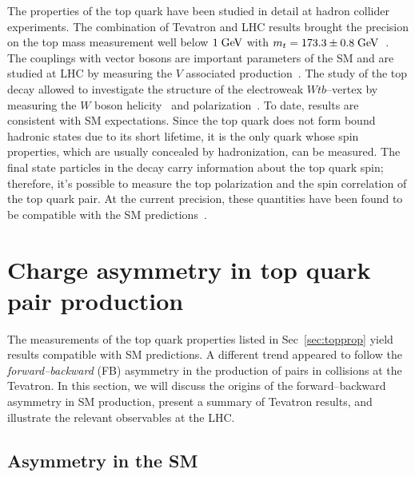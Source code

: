 The properties of the top quark have been studied in detail at hadron
collider experiments. The combination of Tevatron and LHC results
brought the precision on the top mass measurement well below $1 \; \mathrm{GeV}{}$
with $m_t=173.3\pm{}0.8 \; \mathrm{GeV}{}$~\cite{topmass}.
The couplings with vector bosons are important parameters of the SM
and are studied at LHC by measuring the \ttbar{}$V$ associated
production~\cite{CMS-PAS-TOP-13-011,ATLAS-CONF-2014-038}.
The study of the top decay allowed to investigate the structure of the
electroweak $Wtb$--vertex by measuring the $W$ boson
helicity~\cite{Khachatryan:2014vma} and
polarization~\cite{ATLAS-CONF-2013-033}. To date, results are
consistent with SM expectations.
Since the top quark does not form bound hadronic states due to its
short lifetime, it is the only quark whose spin properties, which are usually
concealed by hadronization, can be measured. The final state
particles in the decay carry information about the top quark spin;
therefore, it's possible to measure the top polarization and the spin
correlation of the top quark pair. At the current precision, these
quantities have been found to be compatible with the SM
predictions~\cite{Aad:2013ksa,Aad:2014pwa,Chatrchyan:2013wua}. 

\section{Charge asymmetry in top quark pair production}
\label{sec:topca}

The measurements of the top quark properties listed in
Sec~\ref{sec:topprop} yield results compatible with SM predictions.
A different trend appeared to follow the {\it forward--backward}
(FB) asymmetry in the production of \ttbar{} pairs in \ppbar{}
collisions at the Tevatron. In this section, we will discuss the
origins of the forward--backward asymmetry in SM \ttbar{} production,
present a summary of Tevatron results, and illustrate the relevant
observables at the LHC. 

\subsection{Asymmetry in the SM}
\label{sec:smca}

